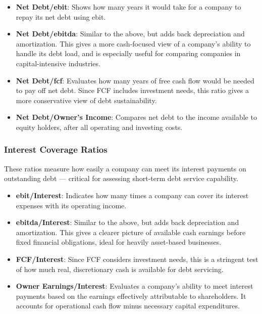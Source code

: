 \documentclass[11pt,english,a4paper,hidelinks]{book}
\begin{document}
\begin{itemize}
    \item \textbf{Net Debt/\acrshort{ebit}}: Shows how many years it would take for a company to repay its net debt using \acrshort{ebit}.
    
    \item \textbf{Net Debt/\acrshort{ebitda}}: Similar to the above, but adds back depreciation and amortization. This gives a more cash-focused view of a company's ability to handle its debt load, and is especially useful for comparing companies in capital-intensive industries.
    
    \item \textbf{Net Debt/\acrshort{fcf}}: Evaluates how many years of free cash flow would be needed to pay off net debt. Since FCF includes investment needs, this ratio gives a more conservative view of debt sustainability.
    
    \item \textbf{Net Debt/Owner's Income}: Compares net debt to the income available to equity holders, after all operating and investing costs.
\end{itemize}

\subsubsection{Interest Coverage Ratios}
These ratios measure how easily a company can meet its interest payments on outstanding debt — critical for assessing short-term debt service capability.

\begin{itemize}
    \item \textbf{\acrshort{ebit}/Interest}: Indicates how many times a company can cover its interest expenses with its operating income.
    
    \item \textbf{\acrshort{ebitda}/Interest}: Similar to the above, but adds back depreciation and amortization. This gives a clearer picture of available cash earnings before fixed financial obligations, ideal for heavily asset-based businesses.
    
    \item \textbf{FCF/Interest}: Since FCF considers investment needs, this is a stringent test of how much real, discretionary cash is available for debt servicing.
    
    \item \textbf{Owner Earnings/Interest}: Evaluates a company's ability to meet interest payments based on the earnings effectively attributable to shareholders. It accounts for operational cash flow minus necessary capital expenditures.
\end{itemize}
\end{document}
